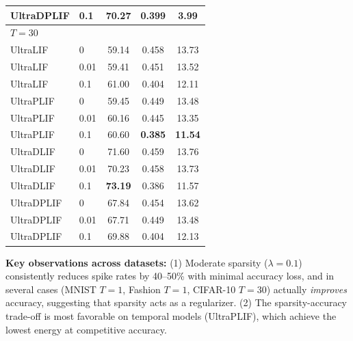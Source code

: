 \documentclass{article}
\theoremstyle{plain}
\theoremstyle{definition}
\theoremstyle{remark}
\begin{document}
\begin{table}[h]
\begin{center}
\begin{small}
\begin{tabular}{llccc}
UltraDPLIF & 0.1  & \textbf{70.27} & 0.399 & 3.99 \\
\midrule
\multicolumn{5}{l}{\textit{$T{=}30$}} \\
UltraLIF   & 0    & 59.14 & 0.458 & 13.73 \\
UltraLIF   & 0.01 & 59.41 & 0.451 & 13.52 \\
UltraLIF   & 0.1  & 61.00 & 0.404 & 12.11 \\
UltraPLIF  & 0    & 59.45 & 0.449 & 13.48 \\
UltraPLIF  & 0.01 & 60.16 & 0.445 & 13.35 \\
UltraPLIF  & 0.1  & 60.60 & \textbf{0.385} & \textbf{11.54} \\
UltraDLIF  & 0    & 71.60 & 0.459 & 13.76 \\
UltraDLIF  & 0.01 & 70.23 & 0.458 & 13.73 \\
UltraDLIF  & 0.1  & \textbf{73.19} & 0.386 & 11.57 \\
UltraDPLIF & 0    & 67.84 & 0.454 & 13.62 \\
UltraDPLIF & 0.01 & 67.71 & 0.449 & 13.48 \\
UltraDPLIF & 0.1  & 69.88 & 0.404 & 12.13 \\
\bottomrule
\end{tabular}
\end{small}
\end{center}
\vskip -0.1in
\end{table}

\textbf{Key observations across datasets:} (1) Moderate sparsity ($\lambda{=}0.1$) consistently reduces spike rates by 40--50\% with minimal accuracy loss, and in several cases (MNIST $T{=}1$, Fashion $T{=}1$, CIFAR-10 $T{=}30$) actually \emph{improves} accuracy, suggesting that sparsity acts as a regularizer. (2) The sparsity-accuracy trade-off is most favorable on temporal models (UltraPLIF), which achieve the lowest energy at competitive accuracy.
\end{document}
